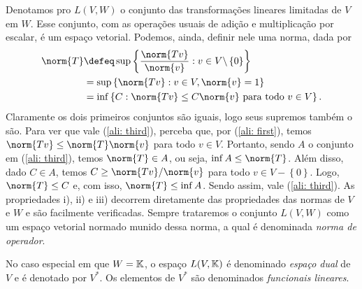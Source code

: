 Denotamos pro \( L(V, W) \) o conjunto das transformações lineares limitadas de \( V \) em \( W \).
Esse conjunto, com as operações usuais de adição e multiplicação por escalar, é um espaço vetorial.
Podemos, ainda, definir nele uma norma, dada por
\begin{align}
    \norm{ T } &\defeq \sup \left\{ \frac{ \norm{ Tv } }{ \norm{ v } } : v \in V \backslash \left\{ 0 \right\} \right\} \label{ali: first} \\
    &= \sup \left\{ \norm{ Tv } : v \in V, \norm{ v } = 1 \right\} \label{ali: sec} \\
    &= \inf \left\{ C : \norm{ Tv } \leq C \norm{ v } \text{ para todo } v \in V \right\}
    \label{ali: third}
.\end{align}
Claramente os dois primeiros conjuntos são iguais, logo seus supremos também o são.
Para ver que vale (\ref{ali: third}), perceba que, por (\ref{ali: first}), temos \( \norm{ Tv } \leq \norm{ T } \norm{ v } \) para todo \( v \in V \).
Portanto, sendo \( A \) o conjunto em (\ref{ali: third}), temos \( \norm{ T } \in A \), ou seja, \( \inf A \leq \norm{ T } \).
Além disso, dado \( C \in A \), temos \( C \geq \norm{ Tv } / \norm{ v } \) para todo \( v \in V - \left\{ 0 \right\} \).
Logo, \( \norm{ T } \leq C \) e, com isso, \( \norm{ T } \leq \inf A \).
Sendo assim, vale (\ref{ali: third}).
As propriedades i), ii) e iii) decorrem diretamente das propriedades das normas de \( V \) e \( W \) e são facilmente verificadas.
Sempre trataremos o conjunto \( L(V, W) \) como um espaço vetorial normado munido dessa norma, a qual é denominada \emph{norma de operador}. 

No caso especial em que \( W = \mathbb{K} \),
o espaço \( L(V, \mathbb{K}) \) é denominado \emph{espaço dual} de \( V \) e é denotado por \( V^{ * } \).
Os elementos de \( V^{ * } \) são denominados \emph{funcionais lineares}.